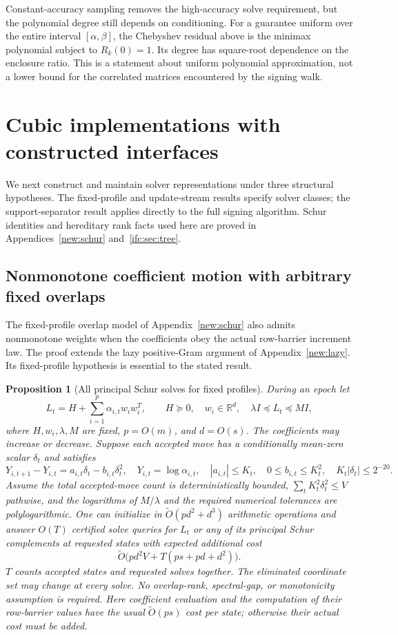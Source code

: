 \documentclass[11pt]{amsart}
\newtheorem{proposition}[theorem]{Proposition}
\theoremstyle{definition}\newtheorem{definition}[theorem]{Definition}
\theoremstyle{remark}\newtheorem{remark}[theorem]{Remark}
\numberwithin{equation}{section}
\begin{document}
Constant-accuracy sampling removes the high-accuracy solve requirement,
but the polynomial degree still depends on conditioning.
For a guarantee uniform over the entire interval $[\alpha,\beta]$,
the Chebyshev residual above is the minimax polynomial subject to
$R_k(0)=1$. Its degree has square-root dependence on the enclosure ratio.
This is a statement about uniform polynomial approximation, not a lower
bound for the correlated matrices encountered by the signing walk.

\section{Cubic implementations with constructed interfaces}\label{new:structured}

We next construct and maintain solver representations under three
structural hypotheses. The fixed-profile and update-stream
results specify solver classes; the support-separator result applies
directly to the full signing algorithm. Schur identities and hereditary
rank facts used here are proved in Appendices~\ref{new:schur} and~\ref{ifc:sec:tree}.

\subsection{Nonmonotone coefficient motion with arbitrary fixed overlaps}
\label{ifc:sec:nonmonotone-fixed-overlap}

The fixed-profile overlap model of Appendix~\ref{new:schur}
also admits nonmonotone weights when the coefficients obey the actual row-barrier increment law.
The proof extends the lazy positive-Gram argument of Appendix~\ref{new:lazy}.
Its fixed-profile hypothesis is essential to the stated result.

\begin{proposition}[All principal Schur solves for fixed profiles]
During an epoch let
\[
 L_t=H+\sum_{i=1}^{p}\alpha_{i,t}w_iw_i^T,\qquad
 H\succeq0,\quad w_i\in\mathbb R^d,
 \quad \lambda I\preceq L_t\preceq MI,
\]
where $H,w_i,\lambda,M$ are fixed, $p=O(m)$, and $d=O(s)$.
The coefficients may increase or decrease. Suppose each accepted move
has a conditionally mean-zero scalar $\delta_t$ and satisfies
\[
 Y_{i,t+1}-Y_{i,t}=a_{i,t}\delta_t-b_{i,t}\delta_t^2,
 \quad Y_{i,t}=\log\alpha_{i,t},\quad
 |a_{i,t}|\le K_t,\quad 0\le b_{i,t}\le K_t^2,
 \quad K_t|\delta_t|\le 2^{-20}.
\]
Assume the total accepted-move count is deterministically bounded,
$\sum_t K_t^2\delta_t^2\le V$ pathwise, and the logarithms of $M/\lambda$
and the required numerical tolerances are polylogarithmic.
One can initialize in $\widetilde O(pd^2+d^3)$ arithmetic operations and
answer $O(T)$ certified solve queries for $L_t$ or any of its principal
Schur complements at requested states with expected additional cost
\[
 \widetilde O\bigl(pd^2V+T(ps+pd+d^2)\bigr).
\]
$T$ counts accepted states and requested solves together.
The eliminated coordinate set may change at every solve. No overlap-rank,
spectral-gap, or monotonicity assumption is required. Here coefficient
evaluation and the computation of their row-barrier values have the
usual $\widetilde O(ps)$ cost per state; otherwise their actual cost must
be added.
\end{proposition}
\end{document}
